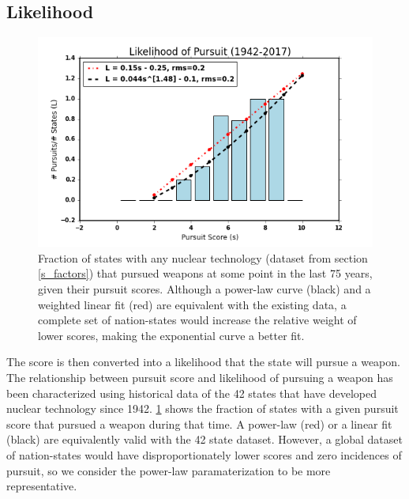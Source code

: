  \subsection{Likelihood}

\begin{figure}%
\includegraphics[scale=0.7]{./figs/pe_likely.png}
\caption{Fraction of states with any nuclear technology (dataset from section \ref{s_factors}) that pursued weapons at some point in the last 75 years, given their pursuit scores. Although a power-law curve (black) and a weighted linear fit (red) are equivalent with the existing data, a complete set of nation-states would increase the relative weight of lower scores, making the exponential curve a better fit.}
\label{fig:likely}
\end{figure}
 
The score is then converted into a likelihood that the state will pursue a weapon. The relationship between pursuit score and likelihood of pursuing a weapon has been characterized using historical data of the 42 states that have developed nuclear technology since 1942.  \ref{fig:likely} shows the fraction of states with a given pursuit score that pursued a weapon during that time. A power-law (red) or a linear fit (black) are  equivalently valid with the 42 state dataset. However, a global dataset of nation-states would have disproportionately lower scores and zero incidences of pursuit, so we consider the power-law paramaterization to be more representative.

